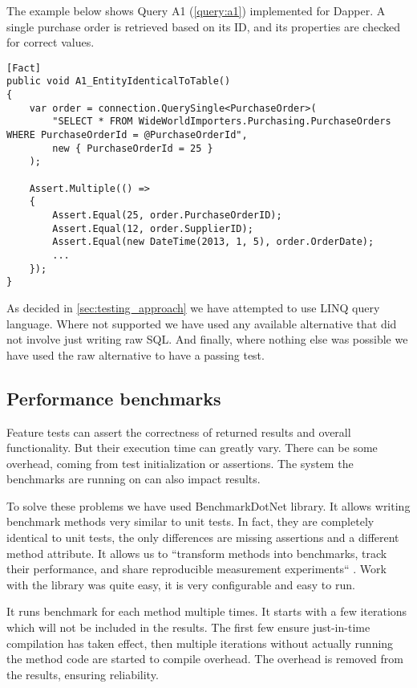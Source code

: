 The example below shows Query A1 (\autoref{query:a1}) implemented for Dapper. A single purchase order is retrieved based on its ID, and its properties are checked for correct values. 
\begin{lstlisting}[language=CSharp]
[Fact]
public void A1_EntityIdenticalToTable()
{
    var order = connection.QuerySingle<PurchaseOrder>(
        "SELECT * FROM WideWorldImporters.Purchasing.PurchaseOrders WHERE PurchaseOrderId = @PurchaseOrderId",
        new { PurchaseOrderId = 25 }
    );

    Assert.Multiple(() =>
    {
        Assert.Equal(25, order.PurchaseOrderID);
        Assert.Equal(12, order.SupplierID);
        Assert.Equal(new DateTime(2013, 1, 5), order.OrderDate);
        ...
    });
}
\end{lstlisting}

As decided in \autoref{sec:testing_approach} we have attempted to use LINQ query language. Where not supported we have used any available alternative that did not involve just writing raw SQL. And finally, where nothing else was possible we have used the raw alternative to have a passing test.  

\subsection{Performance benchmarks}
Feature tests can assert the correctness of returned results and overall functionality. But their execution time can greatly vary. There can be some overhead, coming from test initialization or assertions. The system the benchmarks are running on can also impact results.

To solve these problems we have used BenchmarkDotNet library\cite{BenchmarkDotNet}. It allows writing benchmark methods very similar to unit tests. In fact, they are completely identical to unit tests, the only differences are missing assertions and a different method attribute. It allows us to ``transform methods into benchmarks, track their performance, and share reproducible measurement experiments`` \cite{BenchmarkDotNet}. Work with the library was quite easy, it is very configurable and easy to run. 

It runs benchmark for each method multiple times. It starts with a few iterations which will not be included in the results. The first few ensure just-in-time compilation has taken effect, then multiple iterations without actually running the method code are started to compile overhead. The overhead is removed from the results, ensuring reliability. 


